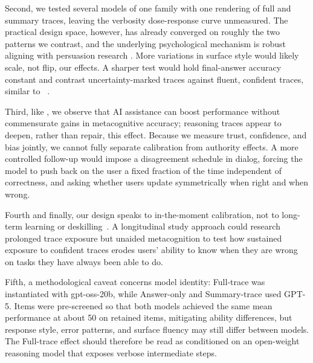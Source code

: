 \documentclass[acmlarge,review=true, anonymous=true]{acmart}
\begin{document}
Second, we tested several models of one family with one rendering of full and summary traces, leaving the verbosity dose-response curve unmeasured. The practical design space, however, has already converged on roughly the two patterns we contrast, and the underlying psychological mechanism is robust aligning with persuasion research \cite{}. More variations in surface style would likely scale, not flip, our effects. A sharper test would hold final-answer accuracy constant and contrast uncertainty-marked traces against fluent, confident traces, similar to ~\citet{kim2024m}.

Third, like \citet{FERNANDES2026108779}, we observe that AI assistance can boost performance without commensurate gains in metacognitive accuracy; reasoning traces appear to deepen, rather than repair, this effect. Because we measure trust, confidence, and bias jointly, we cannot fully separate calibration from authority effects. A more controlled follow-up would impose a disagreement schedule in dialog, forcing the model to push back on the user a fixed fraction of the time independent of correctness, and asking whether users update symmetrically when right and when wrong.

Fourth and finally, our design speaks to in-the-moment calibration, not to long-term learning or deskilling~\cite{bastani2024generative}. A longitudinal study approach could research prolonged trace exposure but unaided metacognition to test how sustained exposure to confident traces erodes users' ability to know when they are wrong on tasks they have always been able to do. 

Fifth, a methodological caveat concerns model identity: Full-trace was instantiated with gpt-oss-20b, while Answer-only and Summary-trace used GPT-5. Items were pre-screened so that both models achieved the same mean performance  at about 50\5 on retained items, mitigating ability differences, but response style, error patterns, and surface fluency may still differ between models. The Full-trace effect should therefore be read as conditioned on an open-weight reasoning model that exposes verbose intermediate steps. 


\end{document}
